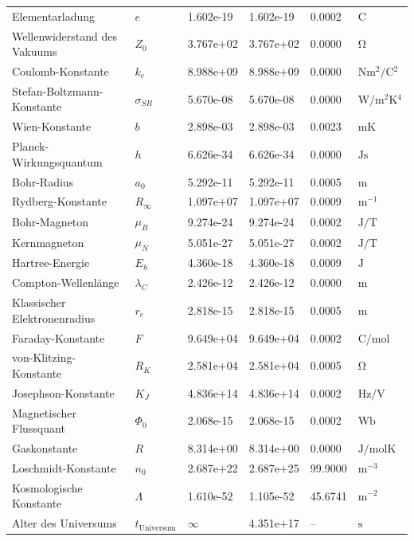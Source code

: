 \begin{longtable}{>{\raggedright}p{4.0cm}p{1.2cm}p{1.8cm}p{2.0cm}p{1.6cm}p{2.0cm}}
		Elementarladung & $e$ & 1.602e-19 & 1.602e-19 & 0.0002 & $\si{\coulomb}$ \\
		Wellenwiderstand des Vakuums & $Z_0$ & 3.767e+02 & 3.767e+02 & 0.0000 & $\si{\ohm}$ \\
		Coulomb-Konstante & $k_e$ & 8.988e+09 & 8.988e+09 & 0.0000 & $\si{\newton \meter^2 \per \coulomb^2}$ \\
		Stefan-Boltzmann-Konstante & $\sigma_{SB}$ & 5.670e-08 & 5.670e-08 & 0.0000 & $\si{\watt \per \meter^2 \kelvin^4}$ \\
		Wien-Konstante & $b$ & 2.898e-03 & 2.898e-03 & 0.0023 & $\si{\meter \kelvin}$ \\
		Planck-Wirkungsquantum & $h$ & 6.626e-34 & 6.626e-34 & 0.0000 & $\si{\joule \second}$ \\
		Bohr-Radius & $a_0$ & 5.292e-11 & 5.292e-11 & 0.0005 & $\si{\meter}$ \\
		Rydberg-Konstante & $R_\infty$ & 1.097e+07 & 1.097e+07 & 0.0009 & $\si{\meter^{-1}}$ \\
		Bohr-Magneton & $\mu_B$ & 9.274e-24 & 9.274e-24 & 0.0002 & $\si{\joule \per \tesla}$ \\
		Kernmagneton & $\mu_N$ & 5.051e-27 & 5.051e-27 & 0.0002 & $\si{\joule \per \tesla}$ \\
		Hartree-Energie & $E_h$ & 4.360e-18 & 4.360e-18 & 0.0009 & $\si{\joule}$ \\
		Compton-Wellenlänge & $\lambda_C$ & 2.426e-12 & 2.426e-12 & 0.0000 & $\si{\meter}$ \\
		Klassischer Elektronenradius & $r_e$ & 2.818e-15 & 2.818e-15 & 0.0005 & $\si{\meter}$ \\
		Faraday-Konstante & $F$ & 9.649e+04 & 9.649e+04 & 0.0002 & $\si{\coulomb \per \mole}$ \\
		von-Klitzing-Konstante & $R_K$ & 2.581e+04 & 2.581e+04 & 0.0005 & $\si{\ohm}$ \\
		Josephson-Konstante & $K_J$ & 4.836e+14 & 4.836e+14 & 0.0002 & $\si{\hertz \per \volt}$ \\
		Magnetischer Flussquant & $\Phi_0$ & 2.068e-15 & 2.068e-15 & 0.0002 & $\si{\weber}$ \\
		Gaskonstante & $R$ & 8.314e+00 & 8.314e+00 & 0.0000 & $\si{\joule \per \mole \kelvin}$ \\
		Loschmidt-Konstante & $n_0$ & 2.687e+22 & 2.687e+25 & 99.9000 & $\si{\meter^{-3}}$ \\
		Kosmologische Konstante & $\Lambda$ & 1.610e-52 & 1.105e-52 & 45.6741 & $\si{\meter^{-2}}$ \\
		Alter des Universums & $t_{\text{Universum}}$ & $\infty$ & 4.351e+17 & -- & $\si{\second}$ \\

\end{longtable}

